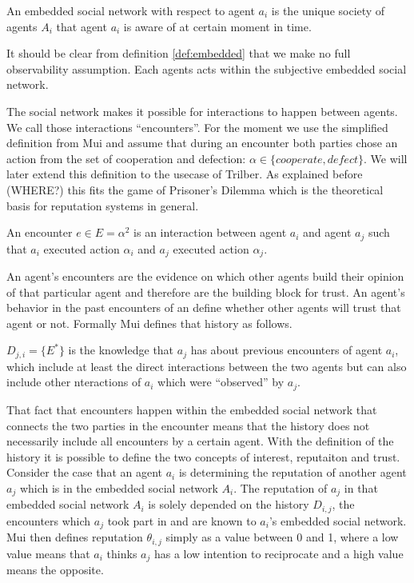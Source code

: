 \begin{defn}
    \label{def:embedded}
    An embedded social network with respect to agent $a_i$ is the unique society of agents $A_i$
    that agent $a_i$ is aware of at certain moment in time.
\end{defn}

It should be clear from definition \ref{def:embedded} that we make no full observability assumption. 
Each agents acts within the subjective embedded social network. 

The social network makes it possible for interactions to happen between agents. We call those
interactions ``encounters''. For the moment we use the simplified definition from Mui and assume
that during an encounter both parties chose an action from the set of cooperation and defection:
 $\alpha \in \{\textit{cooperate}, \textit{defect}\}$. We will later extend this definition to the 
usecase of Trilber. As explained before ({\color{red}WHERE?}) this fits the game of Prisoner's 
Dilemma which is the theoretical basis for reputation systems in general. 

\begin{defn}[Encounter]
    An encounter $e \in E = \alpha^2$ is an interaction between agent $a_i$ and agent $a_j$ such that $a_i$
    executed action $\alpha_i$ and $a_j$ executed action $\alpha_j$.
\end{defn}

An agent's encounters are the evidence on which other agents build their opinion of that particular
agent and therefore are the building block for trust. An agent's behavior in the past encounters of 
an define whether other agents will trust that agent or not. Formally Mui defines that history as
follows.

\begin{defn}[History]
    $D_{j,i} = \{ E^* \}$ is the knowledge that $a_j$ has about previous encounters of agent $a_i$,
    which include at least the direct interactions between the two agents but can also include other
    nteractions of $a_i$ which were ``observed'' by $a_j$.
\end{defn}

That fact that encounters happen within the embedded social network that connects the two parties in
the encounter means that the history does not necessarily include all encounters by a certain agent.
With the definition of the history it is possible to define the two concepts of interest, reputaiton
and trust. Consider the case that an agent $a_i$ is determining the reputation of another agent $a_j$
which is in the embedded social network $A_i$. The reputation of $a_j$ in that embedded social
network $A_i$ is solely depended on the history $D_{i,j}$, the encounters which $a_j$ took part in 
and are known to $a_i$'s embedded social network. Mui then defines reputation $\theta_{i,j}$ simply 
as a value between 0 and 1, where a low value means that $a_i$ thinks $a_j$ has a low intention to
reciprocate and a high value means the opposite.

